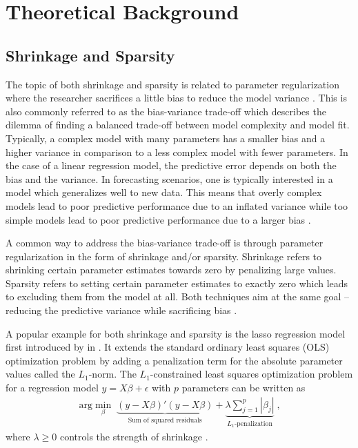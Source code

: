 \section{Theoretical Background}
\label{sec:theoretical_background}

\subsection{Shrinkage and Sparsity}
\label{subsec:shrinkage_and_sparsity}
The topic of both shrinkage and sparsity is related to parameter regularization where the researcher sacrifices a little bias to reduce the model variance \parencite{tibshirani_regression_1996}. This is also commonly referred to as the bias-variance trade-off which describes the dilemma of finding a balanced trade-off between model complexity and model fit. Typically, a complex model with many parameters has a smaller bias and a higher variance in comparison to a less complex model with fewer parameters. In the case of a linear regression model, the predictive error depends on both the bias and the variance. In forecasting scenarios, one is typically interested in a model which generalizes well to new data. This means that overly complex models lead to poor predictive performance due to an inflated variance while too simple models lead to poor predictive performance due to a larger bias \parencite[pp.~223~f.]{hastie_elements_2009}.

A common way to address the bias-variance trade-off is through parameter regularization in the form of shrinkage and/or sparsity. Shrinkage refers to shrinking certain parameter estimates towards zero by penalizing large values. Sparsity refers to setting certain parameter estimates to exactly zero which leads to excluding them from the model at all. Both techniques aim at the same goal -- reducing the predictive variance while sacrificing bias \parencite{figueiredo_adaptive_2003,tibshirani_regression_1996}.

A popular example for both shrinkage and sparsity is the lasso regression model first introduced by \citeauthor{tibshirani_regression_1996} in \citeyear{tibshirani_regression_1996}. It extends the standard ordinary least squares (OLS) optimization problem by adding a penalization term for the absolute parameter values called the $L_1$-norm. The $L_1$-constrained least squares optimization problem for a regression model $y = X \beta + \epsilon$ with $p$ parameters can be written as
\begin{align}
    \label{eq:lasso_optimiziation_problem}
    \text{arg} \min_{\beta} \; \underbrace{(y - X\beta)' (y - X\beta)}_{\text{Sum of squared residuals}} + \underbrace{\lambda \sum_{j = 1}^{p}|\beta_j|}_{L_1\text{-penalization}} \; \text{,}
\end{align}
where $\lambda \geq 0$ controls the strength of shrinkage \parencite{park_bayesian_2008,yuan_efficient_2005,tibshirani_regression_1996}.

